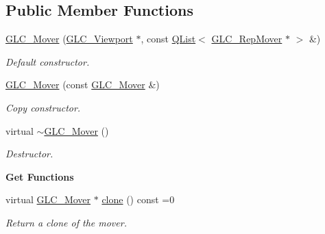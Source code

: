 \subsection*{Public Member Functions}
\begin{DoxyCompactItemize}
\item 
\hyperlink{class_g_l_c___mover_a883f83eb58c6a93d86ccafe100cd2fce}{G\-L\-C\-\_\-\-Mover} (\hyperlink{class_g_l_c___viewport}{G\-L\-C\-\_\-\-Viewport} $\ast$, const \hyperlink{class_q_list}{Q\-List}$<$ \hyperlink{class_g_l_c___rep_mover}{G\-L\-C\-\_\-\-Rep\-Mover} $\ast$ $>$ \&)
\begin{DoxyCompactList}\small\item\em Default constructor. \end{DoxyCompactList}\item 
\hyperlink{class_g_l_c___mover_a07444e354abc9f451e8d6afbbed60eb4}{G\-L\-C\-\_\-\-Mover} (const \hyperlink{class_g_l_c___mover}{G\-L\-C\-\_\-\-Mover} \&)
\begin{DoxyCompactList}\small\item\em Copy constructor. \end{DoxyCompactList}\item 
virtual \hyperlink{class_g_l_c___mover_a76a09a838476379ec1a9e47175777f87}{$\sim$\-G\-L\-C\-\_\-\-Mover} ()
\begin{DoxyCompactList}\small\item\em Destructor. \end{DoxyCompactList}\end{DoxyCompactItemize}
\begin{Indent}{\bf Get Functions}\par
\begin{DoxyCompactItemize}
\item 
virtual \hyperlink{class_g_l_c___mover}{G\-L\-C\-\_\-\-Mover} $\ast$ \hyperlink{class_g_l_c___mover_abcf4ca22f14bc73158e3ad6e8d60410c}{clone} () const =0
\begin{DoxyCompactList}\small\item\em Return a clone of the mover. \end{DoxyCompactList}\end{DoxyCompactItemize}
\end{Indent}
